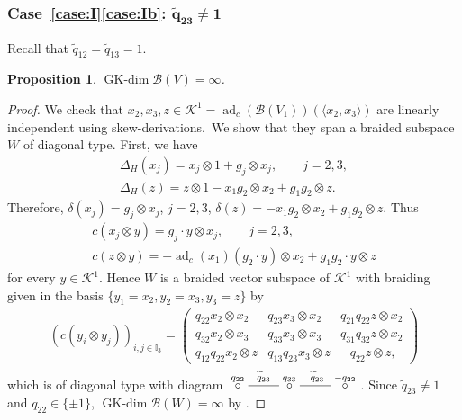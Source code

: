 \documentclass[10pt,a4paper]{amsart}
\numberwithin{equation}{section}
\newtheorem{Proposition}[Theorem]{Proposition}
 { \theoremstyle{definition}
\newtheorem{Definition}[Theorem]{Definition}
\newtheorem{Note}[Theorem]{Note}
\newtheorem{Example}[Theorem]{Example}
\newtheorem{Remark}[Theorem]{Remark} }
\newcommand{\adc}{\operatorname{ad}_c}
\newcommand{\GK}{\operatorname{GK-dim}}
\newcommand{\toba}{\mathscr B}
\newcommand{\K}{{\mathcal{K}}}
\newcommand{\I}{{\mathbb I}}
\begin{document}
\subsubsection[Case (I)(b): widetilde\{q\}\_\{23\} neq 1]{Case~\ref{case:I}\ref{case:Ib}: $\boldsymbol{\widetilde{q}_{23} \neq 1}$}
Recall that $\widetilde{q}_{12}= \widetilde{q}_{13}=1$.

\begin{Proposition}\label{prop:pale-2pts-Ib} $\GK \toba(V) = \infty$.
\end{Proposition}

\begin{proof}
We check that $x_2, x_3, z\in \K^1 = \adc(\toba(V_1))(\langle x_2, x_3 \rangle)$ are linearly independent using skew-derivations.\
We show that they span a braided subspace $W$ of diagonal type. First, we have
\begin{gather*}
\Delta_{H}(x_j) = x_j \otimes 1 + g_j \otimes x_j ,\qquad j =2,3, \\
\Delta_{H}(z) = z \otimes 1 - x_1 g_2 \otimes x_2 + g_1g_2 \otimes z.
\end{gather*}
Therefore,
$\delta(x_j) = g_j \otimes x_j$, $j =2,3$,
$\delta(z) = -x_1 g_2 \otimes x_2 + g_1g_2 \otimes z$.
Thus
\begin{gather*}
c(x_j\otimes y) = g_j \cdot y \otimes x_j,\qquad j =2,3, \\
c(z\otimes y) = -\adc(x_1)(g_2 \cdot y) \otimes x_2 + g_1g_2 \cdot y \otimes z
\end{gather*}
for every $y \in \K^1$.
Hence $W$ is a braided vector subspace of $\K^1$ with braiding given in the basis $\{y_1 = x_2, y_2= x_3, y_3 = z \}$ by
\begin{align*}
(c(y_i \otimes y_j))_{i,j\in \I_{3}}=
\begin{pmatrix}
q_{22} x_2 \otimes x_2 & q_{23} x_3 \otimes x_2 & q_{21}q_{22} z \otimes x_2 \\
q_{32} x_2 \otimes x_3 & q_{33} x_3 \otimes x_3 & q_{31}q_{32} z \otimes x_2 \\
q_{12}q_{22} x_2 \otimes z & q_{13}q_{23} x_3 \otimes z & -q_{22} z \otimes z,
\end{pmatrix}
\end{align*}
which is of diagonal type with diagram
$\xymatrix{
\overset{q_{22}}{\circ} \ar @{-}[r]^{\widetilde{q}_{23}} & \overset{q_{33}}{\circ} \ar @{-}[r]^{\widetilde{q}_{23}} &
\overset{-q_{22}}{\circ}}$.
Since $\widetilde{q}_{23} \neq 1$ and $q_{22}\in \{\pm 1\}$, $\GK \toba(W) = \infty$ by \cite[Lemma~2.3.7]{AAH-triang}.
\end{proof}
\end{document}
